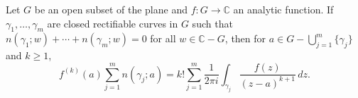 Let $G$ be an open subset of the plane and $f: G \to \mathbb{C}$ an analytic function. If $\gamma_1, \ldots, \gamma_m$ are closed rectifiable curves in $G$ such that $n(\gamma_1; w) + \cdots + n(\gamma_m; w) = 0$ for all $w \in \mathbb{C} - G$, then for $a \in G - \bigcup_{j=1}^{m} \{\gamma_j\}$ and $k \geq 1$,
$$
f^{(k)}(a) \sum_{j=1}^{m} n(\gamma_j; a) = k! \sum_{j=1}^{m} \frac{1}{2\pi i} \int_{\gamma_j} \frac{f(z)}{(z - a)^{k+1}} \, dz.
$$
